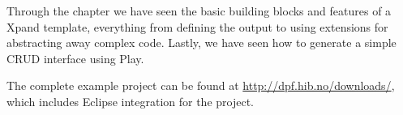 Through the chapter we have seen the basic building blocks and features of a Xpand template, everything from defining the output to using extensions for abstracting away complex code. Lastly, we have seen how to generate a simple CRUD interface using Play.

The complete example project can be found at \url{http://dpf.hib.no/downloads/}, which includes Eclipse integration for the project.


% 
% 
% 
